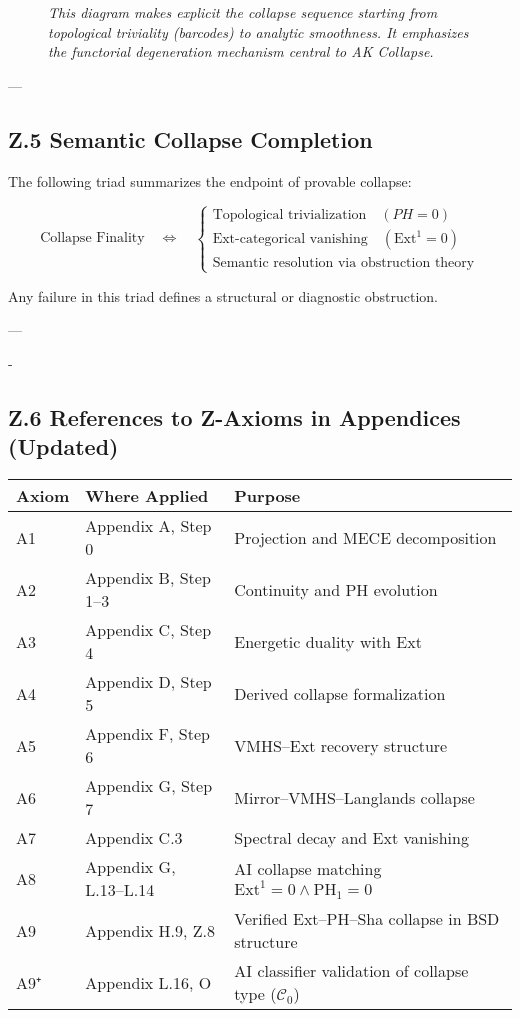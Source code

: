\documentclass[11pt]{article}
\begin{document}
\begin{axiom}
\begin{axiom}
{{\begin{figure}[H]
\textit{This diagram makes explicit the collapse sequence starting from topological triviality (barcodes) to analytic smoothness.  
It emphasizes the functorial degeneration mechanism central to AK Collapse.}
\end{figure}


---

\subsection*{Z.5 Semantic Collapse Completion}

The following triad summarizes the endpoint of provable collapse:

\[
\text{Collapse Finality} \quad \Longleftrightarrow \quad
\begin{cases}
\text{Topological trivialization} \quad (PH = 0) \\
\text{Ext-categorical vanishing} \quad (\mathrm{Ext}^1 = 0) \\
\text{Semantic resolution via obstruction theory}
\end{cases}
\]

Any failure in this triad defines a structural or diagnostic obstruction.

---

-\subsection*{Z.6 References to Z-Axioms in Appendices (Updated)}

\begin{tabular}{lll}
\textbf{Axiom} & \textbf{Where Applied} & \textbf{Purpose} \\
\hline
A1 & Appendix A, Step 0 & Projection and MECE decomposition \\
A2 & Appendix B, Step 1–3 & Continuity and PH evolution \\
A3 & Appendix C, Step 4 & Energetic duality with Ext \\
A4 & Appendix D, Step 5 & Derived collapse formalization \\
A5 & Appendix F, Step 6 & VMHS–Ext recovery structure \\
A6 & Appendix G, Step 7 & Mirror–VMHS–Langlands collapse \\
A7 & Appendix C.3 & Spectral decay and Ext vanishing \\
A8 & Appendix G, L.13–L.14 & AI collapse matching \( \mathrm{Ext}^1 = 0 \land \mathrm{PH}_1 = 0 \) \\
A9 & Appendix H.9, Z.8 & Verified Ext–PH–Sha collapse in BSD structure \\
A9⁺ & Appendix L.16, O & AI classifier validation of collapse type (\( \mathcal{C}_0 \)) \\
\end{tabular}


}}
\end{axiom}
\end{axiom}
\end{document}
